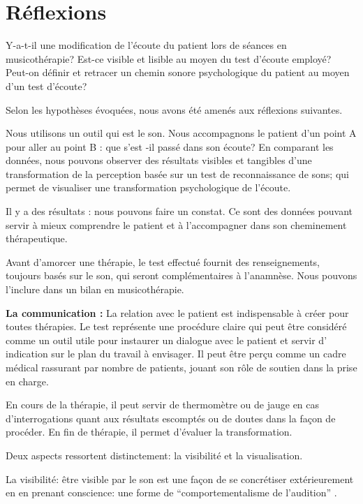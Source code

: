 
\chapter{Réflexions}


Y-a-t-il une modification de l'écoute du patient lors de séances en musicothérapie?
Est-ce visible et lisible au moyen du test d'écoute employé?
Peut-on définir et retracer un chemin sonore psychologique du patient au moyen d'un test d'écoute?


Selon les hypothèses évoquées, nous avons été amenés aux réflexions suivantes.

Nous utilisons un outil qui est le son. Nous accompagnons
le patient d'un point A pour aller au point B : que s'est -il passé
dans son écoute?
En comparant les données, nous pouvons observer des résultats visibles et tangibles 
d'une transformation de la
perception basée sur un test de reconnaissance de sons;  qui permet de visualiser une transformation psychologique
de l'écoute. 


Il y a des résultats : nous pouvons faire un constat.
Ce sont des données pouvant servir à mieux comprendre le patient
et à l'accompagner dans son cheminement thérapeutique.



  Avant d'amorcer une thérapie, le test effectué fournit des renseignements, toujours basés sur le son, qui seront complémentaires à l'anamnèse. Nous pouvons  l'inclure dans un  bilan en musicothérapie.

\textbf{La communication : } 
	La relation avec le patient est indispensable à créer pour toutes thérapies.
	Le test représente une procédure claire qui peut être considéré comme un outil utile pour instaurer un dialogue avec le patient et servir d' indication sur le plan du travail à envisager. Il peut être perçu comme un cadre médical  rassurant par nombre de patients, jouant son rôle de soutien dans la prise en charge.
  
 
En cours de la thérapie, il peut servir de thermomètre ou de jauge en cas d'interrogations quant aux résultats escomptés ou de doutes dans la façon de procéder.
En fin de thérapie, il permet d'évaluer la transformation.


Deux aspects ressortent distinctement: la visibilité et la visualisation.

La visibilité: être visible par le son est une façon de se concrétiser extérieurement en en prenant conscience: une forme de ``comportementalisme de l'audition'' .


